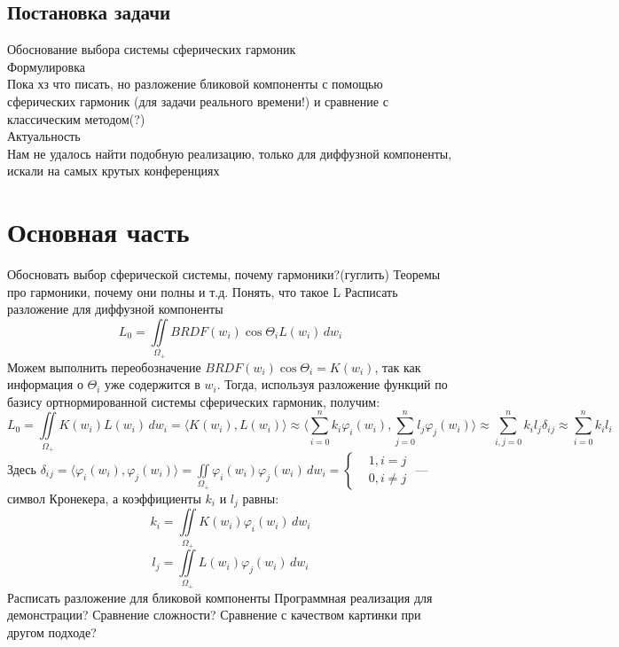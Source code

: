 \documentclass[oneside,final,12pt]{extreport}
\begin{document}
\section{Постановка задачи}
Обоснование выбора системы сферических гармоник \\
Формулировка \\ 
Пока хз что писать, но разложение бликовой компоненты с помощью сферических гармоник (для задачи реального времени!) и сравнение с классическим методом(?) \\
Актуальность  \\
Нам не удалось найти подобную реализацию, только для диффузной компоненты, искали на самых крутых конференциях \\

\chapter{Основная часть}
Обосновать выбор сферической системы, почему гармоники?(гуглить)
Теоремы про гармоники, почему они полны и т.д.
Понять, что такое L
Расписать разложение для диффузной компоненты
\[
L_0=\iint\limits_{\Omega_+} BRDF(w_i)\cos \Theta_i L(w_i)\, dw_i
\]
Можем выполнить переобозначение 
\(BRDF(w_i)\cos \Theta_i = K(w_i) \), 
так как информация о \(\Theta_i\) уже содержится в \( w_i\). Тогда, используя разложение функций по базису ортнормированной системы сферических гармоник, получим: 
\[ 
L_0=\iint\limits_{\Omega_+}K(w_i)L(w_i)\, dw_i = 	\langle K(w_i),L(w_i) \rangle \approx \langle \sum_{i=0}^{n} k_i\varphi_i(w_i) ,\sum_{j=0}^{n} l_j \varphi_j(w_i) \rangle \approx \sum_{i,j=0}^{n} k_i l_j \delta_i{}_j \approx \sum_{i=0}^{n} k_i l_i
\]
Здесь 
\(\delta_i{}_j = \langle \varphi_i(w_i),\varphi_j(w_i) \rangle =  \iint\limits_{\Omega_+} \varphi_i(w_i) \varphi_j(w_i)\, dw_i = 
\left \{\begin{aligned}
& 1 , i=j \\ & 0 , i \neq j
\end{aligned}\right.
\) — символ Кронекера, а коэффициенты \(k_i\) и \(l_j\) равны: \\
\[k_i = \iint\limits_{\Omega_+}K(w_i)\varphi_i(w_i)\, dw_i \] 
\[l_j = \iint\limits_{\Omega_+}L(w_i)\varphi_j(w_i)\, dw_i
\]
Расписать разложение для бликовой компоненты
Программная реализация для демонстрации? 
Сравнение сложности? Сравнение с качеством картинки при другом подходе? 
\end{document}
